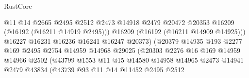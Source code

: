 \begin{lexlean}{RustCore}
\begin{coremodule}
                                          @11
                                          @14
                                          @2665
                                          @2495
                                          @2512
                                          @2473
                                          @14918
                                          @2479
                                          @20472
                                          @20353
                                          @16209
                                          (@16192 (@16211 @14919 @2495)))
                                        @16209
                                        (@16192 (@16211 @14909 @14925)))
                                      @16227
                                      @16231
                                      @16236
                                      @16241
                                      @16247
                                      @20373)
                                    (@20379
                                      @14935
                                      @193
                                      @2277
                                      @169
                                      @2495
                                      @2754
                                      @14959
                                      @14968
                                      @29025
                                      (@20303
                                        @2276
                                        @16
                                        @169
                                        @14959
                                        @14966
                                        @2502
                                        (@43799
                                          @1553
                                          @11
                                          @15
                                          @14580
                                          @14958
                                          @14965
                                          @2473
                                          @14941
                                          @2479
                                          @43834
                                          (@43739
                                            @93
                                            @11
                                            @14
                                            @11452
                                            @2495
                                            @2512

\end{coremodule}
\end{lexlean}
